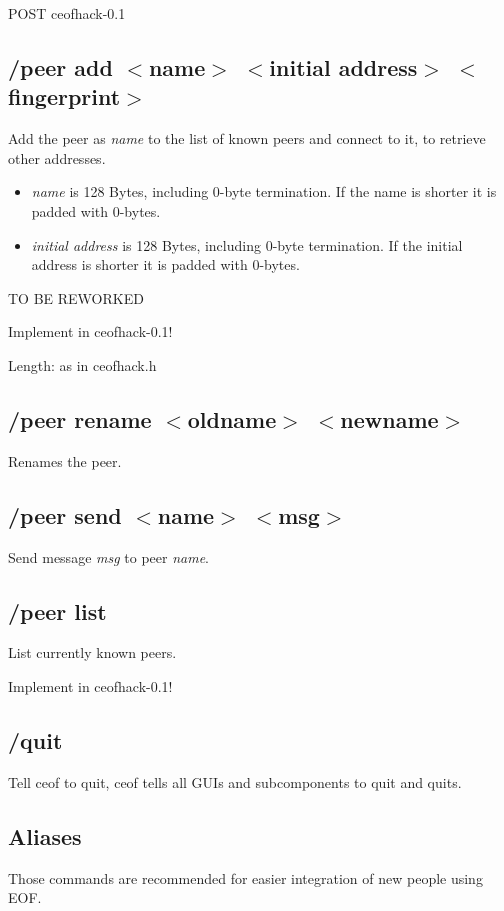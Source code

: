 \documentclass[12pt,a4paper]{book}
\begin{document}
POST ceofhack-0.1


\subsection{/peer add $<$name$>$ $<$initial address$>$ $<$fingerprint$>$}
Add the peer as \textit{name} to the list of known peers
and connect to it, to retrieve other addresses.
\begin{itemize}
\item \textit{name} is 128 Bytes, including 0-byte termination.
If the name is shorter it is padded with 0-bytes.
\item \textit{initial address} is 128 Bytes, including 0-byte termination.
If the initial address is shorter it is padded with 0-bytes.
\end{itemize}

TO BE REWORKED

Implement in ceofhack-0.1!

Length: as in ceofhack.h
\subsection{/peer rename $<$oldname$>$ $<$newname$>$}
Renames the peer.
\subsection{/peer send $<$name$>$ $<$msg$>$}
Send message \textit{msg} to peer \textit{name}.
\subsection{/peer list}
List currently known peers.

Implement in ceofhack-0.1!
\subsection{/quit}
Tell ceof to quit, ceof tells all GUIs and subcomponents to quit and quits.

\subsection{Aliases}
Those commands are recommended for easier integration of new people using EOF.
\end{document}
